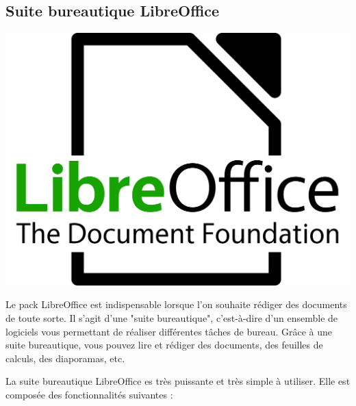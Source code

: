 \documentclass[12pt]{book}
\begin{document}
	\subsection{Suite bureautique LibreOffice}\label{sec:libreoffice}
		\hspace{-.8cm}
		\begin{minipage}[c]{0.3\textwidth}
			\centering
			\includegraphics[width=\textwidth]{include/lo_logo.png}
		\end{minipage}
		\begin{minipage}[c]{.65\textwidth}
			\hspace{.4cm}
			Le pack LibreOffice est indispensable lorsque l'on souhaite rédiger des documents de toute sorte.
			Il s'agit d'une "suite bureautique", c'est-à-dire d'un ensemble de logiciels vous permettant de réaliser différentes tâches de bureau.
			Grâce à une suite bureautique, vous pouvez lire et rédiger des documents, des feuilles de calculs, des diaporamas, etc.
		\end{minipage}\par
			La suite bureautique LibreOffice es très puissante et très simple à utiliser.
			Elle est composée des fonctionnalités suivantes :
\end{document}
